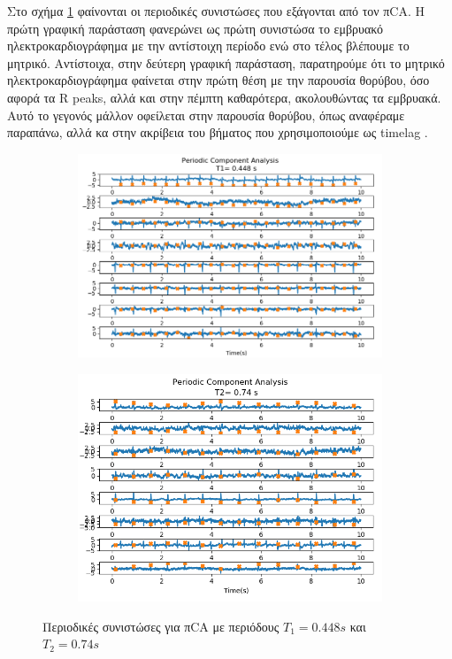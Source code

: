 \noindent Στο σχήμα \ref{fig:5.32} φαίνονται οι περιοδικές συνιστώσες που εξάγονται από τον π\en CA. Η πρώτη γραφική παράσταση φανερώνει ως πρώτη συνιστώσα το εμβρυακό ηλεκτροκαρδιογράφημα με την αντίστοιχη περίοδο ενώ στο τέλος βλέπουμε το μητρικό. Αντίστοιχα, στην δεύτερη γραφική παράσταση, παρατηρούμε ότι το μητρικό ηλεκτροκαρδιογράφημα φαίνεται στην πρώτη θέση με την παρουσία θορύβου, όσο αφορά τα \en R peaks, \gr αλλά και στην πέμπτη καθαρότερα, ακολουθώντας τα εμβρυακά. Αυτό το γεγονός μάλλον οφείλεται στην παρουσία θορύβου, όπως αναφέραμε παραπάνω, αλλά κα στην ακρίβεια του βήματος που χρησιμοποιούμε ως \en timelag \gr.
\begin{figure}[H] 
    \centering
    \begin{subfigure}{0.48 \textwidth}
        \centering
        \includegraphics[width=\textwidth]{daisy/pica_infant.png}\en
    \end{subfigure}
    \hfill
    \begin{subfigure}{0.48 \textwidth}
        \centering
        \includegraphics[width=\textwidth]{daisy/pica_maternal.png}
        \en
    \end{subfigure}
    \gr
    \caption{Περιοδικές συνιστώσες για π\en CA \gr με περιόδους \en $Τ_1 = 0.448 s$ \gr και \en $Τ_2 = 0.74 s$ \gr  }
    \label{fig:5.32}
\end{figure} 
